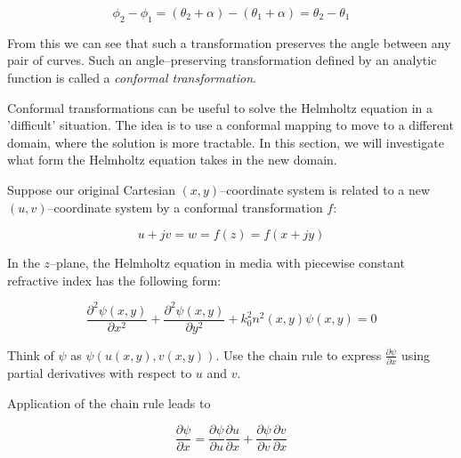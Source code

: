 \begin{equation}
\phi_2 - \phi_1 = (\theta_2 + \alpha) - (\theta_1 + \alpha) = \theta_2 -
\theta_1
\end{equation} 

From this we can see that such a transformation preserves the angle between any pair of curves. Such an angle--preserving transformation defined by an analytic function is called a \emph{conformal transformation}.


Conformal transformations can be useful to solve the Helmholtz equation in a 'difficult' situation. The idea is to use a conformal mapping to move to a different domain, where the solution is more tractable. In this section, we will investigate what form the Helmholtz equation takes in the new domain.

Suppose our original Cartesian $(x,y)$--coordinate system is related to a new $(u,v)$--coordinate system by a conformal transformation $f$:

\begin{equation}
u+jv = w = f(z) = f(x+jy)
\end{equation} 

In the $z$--plane, the Helmholtz equation in media with piecewise constant refractive index has the following form:

\begin{equation}
\frac{\partial^2 \psi(x,y)}{\partial x^2} + \frac{\partial^2 \psi(x,y)}{\partial y^2} + k_0^2 n^2(x,y) \psi(x,y) = 0
\end{equation}

\begin{cue}
Think of $\psi$ as $\psi\left(u(x,y), v(x,y)\right)$. Use the chain rule to express $\frac{\partial \psi}{\partial x}$ using partial derivatives with respect to $u$ and $v$.
\end{cue}

\noindent{}Application of the chain rule leads to

\begin{equation}
\frac{\partial \psi}{\partial x} = \frac{\partial \psi}{\partial u}
\frac{\partial u}{\partial x} + \frac{\partial \psi}{\partial v} \frac{\partial
v}{\partial x}
\end{equation} 


